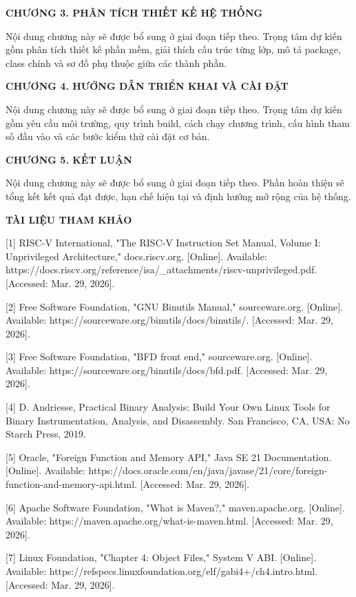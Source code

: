 \documentclass[
]{article}
\begin{document}
\textbf{CHƯƠNG 3. PHÂN TÍCH THIẾT KẾ HỆ THỐNG}

Nội dung chương này sẽ được bổ sung ở giai đoạn tiếp theo. Trọng tâm dự
kiến gồm phân tích thiết kế phần mềm, giải thích cấu trúc từng lớp, mô
tả package, class chính và sơ đồ phụ thuộc giữa các thành phần.

\textbf{CHƯƠNG 4. HƯỚNG DẪN TRIỂN KHAI VÀ CÀI ĐẶT}

Nội dung chương này sẽ được bổ sung ở giai đoạn tiếp theo. Trọng tâm dự
kiến gồm yêu cầu môi trường, quy trình build, cách chạy chương trình,
cấu hình tham số đầu vào và các bước kiểm thử cài đặt cơ bản.

\textbf{CHƯƠNG 5. KẾT LUẬN}

Nội dung chương này sẽ được bổ sung ở giai đoạn tiếp theo. Phần hoàn
thiện sẽ tổng kết kết quả đạt được, hạn chế hiện tại và định hướng mở
rộng của hệ thống.

\textbf{TÀI LIỆU THAM KHẢO}

{[}1{]} RISC-V International, "The RISC-V Instruction Set Manual, Volume
I: Unprivileged Architecture," docs.riscv.org. {[}Online{]}. Available:
https://docs.riscv.org/reference/isa/\_attachments/riscv-unprivileged.pdf.
{[}Accessed: Mar. 29, 2026{]}.

{[}2{]} Free Software Foundation, "GNU Binutils Manual," sourceware.org.
{[}Online{]}. Available: https://sourceware.org/binutils/docs/binutils/.
{[}Accessed: Mar. 29, 2026{]}.

{[}3{]} Free Software Foundation, "BFD front end," sourceware.org.
{[}Online{]}. Available: https://sourceware.org/binutils/docs/bfd.pdf.
{[}Accessed: Mar. 29, 2026{]}.

{[}4{]} D. Andriesse, Practical Binary Analysis: Build Your Own Linux
Tools for Binary Instrumentation, Analysis, and Disassembly. San
Francisco, CA, USA: No Starch Press, 2019.

{[}5{]} Oracle, "Foreign Function and Memory API," Java SE 21
Documentation. {[}Online{]}. Available:
https://docs.oracle.com/en/java/javase/21/core/foreign-function-and-memory-api.html.
{[}Accessed: Mar. 29, 2026{]}.

{[}6{]} Apache Software Foundation, "What is Maven?," maven.apache.org.
{[}Online{]}. Available: https://maven.apache.org/what-is-maven.html.
{[}Accessed: Mar. 29, 2026{]}.

{[}7{]} Linux Foundation, "Chapter 4: Object Files," System V ABI.
{[}Online{]}. Available:
https://refspecs.linuxfoundation.org/elf/gabi4+/ch4.intro.html.
{[}Accessed: Mar. 29, 2026{]}.
\end{document}
